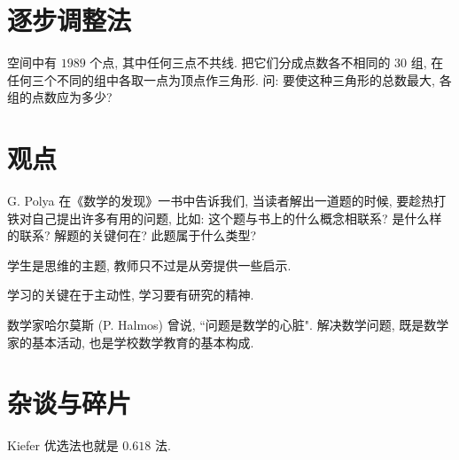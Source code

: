 \section{逐步调整法}
空间中有 $1989$ 个点, 其中任何三点不共线. 把它们分成点数各不相同的 $30$ 组, 在任何三个不同的组中各取一点为顶点作三角形. 问: 要使这种三角形的总数最大, 各组的点数应为多少?
\eq

\section{观点}

G. Polya 在《数学的发现》一书中告诉我们, 当读者解出一道题的时候, 要趁热打铁对自己提出许多有用的问题, 
比如: 这个题与书上的什么概念相联系? 是什么样的联系? 解题的关键何在? 此题属于什么类型?

学生是思维的主题, 教师只不过是从旁提供一些启示.

学习的关键在于主动性, 学习要有研究的精神.

数学家哈尔莫斯 (P. Halmos) 曾说, ``问题是数学的心脏". 解决数学问题, 既是数学家的基本活动, 也是学校数学教育的基本构成.

\section{杂谈与碎片}

Kiefer 优选法也就是 $0.618$ 法.